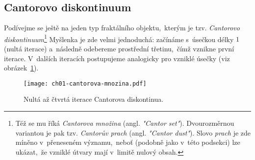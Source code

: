 
\subsection{Cantorovo diskontinuum}\label{subsec:cantorovo_diskontinuum}
Podívejme se ještě na jeden typ fraktálního objektu,~kterým je tzv. \emph{Cantorovo diskontinuum}\footnote{Též se mu říká \emph{Cantorova množina} (angl. \emph{"Cantor set"}). Dvourozměrnou variantou je pak tzv. \emph{Cantorův prach} (angl. \emph{"Cantor dust"}). Slovo \emph{prach} je zde míněno v~přeneseném významu,~neboť (podobně jako v~této podsekci) lze ukázat,~že vzniklé útvary mají v~limitě nulový obsah.} Myšlenka je zde velmi jednoduchá: začínáme s~úsečkou délky $1$ (nultá iterace) a~následně odebereme prostřední třetinu,~čímž vznikne první iterace. V~dalších iteracích postupujeme analogicky pro vzniklé úsečky (viz obrázek~\ref{fig:cantorovo_diskontinuum}).
\begin{figure}[h]
    \centering
    \texttt{[image: ch01-cantorova-mnozina.pdf]}
    \caption{Nultá až čtvrtá iterace Cantorova diskontinua.}
    \label{fig:cantorovo_diskontinuum}
\end{figure}

